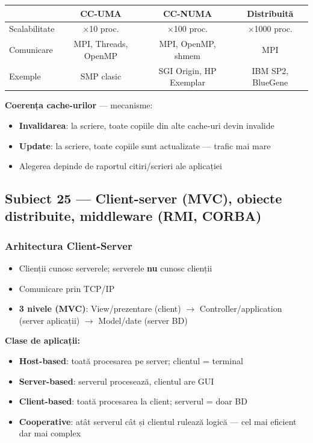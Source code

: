 \documentclass[a4paper,11pt]{article}
\newcommand{\thead}[1]{\cellcolor{tblh}\color{white}\textbf{#1}}
\newcommand{\subiect}[2]{\subsection{Subiect \textcolor{numcol}{#1} — #2}}
\begin{document}
\begin{center}
\begin{tabular}{lccc}
\toprule
\thead{} & \thead{CC-UMA} & \thead{CC-NUMA} & \thead{Distribuită} \\
\midrule
Scalabilitate & $\times$10 proc. & $\times$100 proc. & $\times$1000 proc. \\
Comunicare & MPI, Threads, OpenMP & MPI, OpenMP, shmem & MPI \\
Exemple & SMP clasic & SGI Origin, HP Exemplar & IBM SP2, BlueGene \\
\bottomrule
\end{tabular}
\end{center}

\textbf{Coerența cache-urilor} — mecanisme:
\begin{itemize}[noitemsep]
  \item \textbf{Invalidarea}: la scriere, toate copiile din alte cache-uri devin invalide
  \item \textbf{Update}: la scriere, toate copiile sunt actualizate — trafic mai mare
  \item Alegerea depinde de raportul citiri/scrieri ale aplicației
\end{itemize}

\subiect{25}{Client-server (MVC), obiecte distribuite, middleware (RMI, CORBA)}

\subsubsection{Arhitectura Client-Server}
\begin{itemize}[noitemsep]
  \item Clienții cunosc serverele; serverele \textbf{nu} cunosc clienții
  \item Comunicare prin TCP/IP
  \item \textbf{3 nivele (MVC)}: View/prezentare (client) $\to$ Controller/application (server aplicații) $\to$ Model/date (server BD)
\end{itemize}

\textbf{Clase de aplicații:}
\begin{itemize}[noitemsep]
  \item \textbf{Host-based}: toată procesarea pe server; clientul = terminal
  \item \textbf{Server-based}: serverul procesează, clientul are GUI
  \item \textbf{Client-based}: toată procesarea la client; serverul = doar BD
  \item \textbf{Cooperative}: atât serverul cât și clientul rulează logică — cel mai eficient dar mai complex
\end{itemize}
\end{document}
